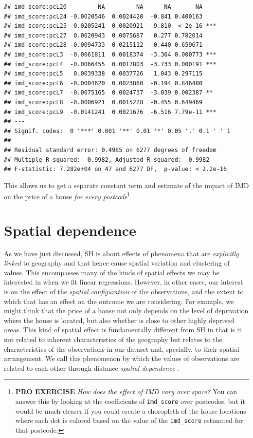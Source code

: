 \documentclass[]{book}
\begin{document}
\begin{verbatim}
## imd_score:pcL20         NA         NA      NA       NA    
## imd_score:pcL24 -0.0020546  0.0024420  -0.841 0.400163    
## imd_score:pcL25 -0.0205241  0.0020921  -9.810  < 2e-16 ***
## imd_score:pcL27  0.0020943  0.0075687   0.277 0.782014    
## imd_score:pcL28 -0.0094733  0.0215112  -0.440 0.659671    
## imd_score:pcL3  -0.0061811  0.0018374  -3.364 0.000773 ***
## imd_score:pcL4  -0.0066455  0.0017803  -3.733 0.000191 ***
## imd_score:pcL5   0.0039338  0.0037726   1.043 0.297115    
## imd_score:pcL6  -0.0004620  0.0023860  -0.194 0.846480    
## imd_score:pcL7  -0.0075165  0.0024737  -3.039 0.002387 ** 
## imd_score:pcL8  -0.0006921  0.0015228  -0.455 0.649469    
## imd_score:pcL9  -0.0141241  0.0021676  -6.516 7.79e-11 ***
## ---
## Signif. codes:  0 '***' 0.001 '**' 0.01 '*' 0.05 '.' 0.1 ' ' 1
## 
## Residual standard error: 0.4985 on 6277 degrees of freedom
## Multiple R-squared:  0.9982, Adjusted R-squared:  0.9982 
## F-statistic: 7.282e+04 on 47 and 6277 DF,  p-value: < 2.2e-16
\end{verbatim}

This allows us to get a separate constant term and estimate of the
impact of IMD on the price of a house \emph{for every
postcode}\footnote{\textbf{PRO EXERCISE} \emph{How does the effect of
  IMD vary over space?} You can answer this by looking at the
  coefficients of \texttt{imd\_score} over postcodes, but it would be
  much clearer if you could create a choropleth of the house locations
  where each dot is colored based on the value of the
  \texttt{imd\_score} estimated for that postcode.}.

\section{Spatial dependence}\label{spatial-dependence}

As we have just discussed, SH is about effects of phenomena that are
\emph{explicitly linked} to geography and that hence cause spatial
variation and clustering of values. This encompasses many of the kinds
of spatial effects we may be interested in when we fit linear
regressions. However, in other cases, our interest is on the effect of
the \emph{spatial configuration} of the observations, and the extent to
which that has an effect on the outcome we are considering. For example,
we might think that the price of a house not only depends on the level
of deprivation where the house is located, but also whether is close to
other highly deprived areas. This kind of spatial effect is
fundamentally different from SH in that is it not related to inherent
characteristics of the geography but relates to the characteristics of
the observations in our dataset and, specially, to their spatial
arrangement. We call this phenomenon by which the values of observations
are related to each other through distance \emph{spatial dependence}
\citep{anselin1988spatial}.
\end{document}
